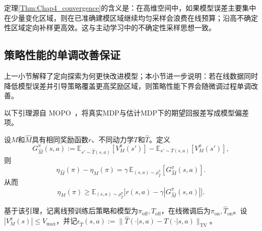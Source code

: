 定理\ref{Thm:Chap4_convergence}的含义是：在高维空间中，如果模型误差主要集中在少量变化区域，则在已准确建模区域继续均匀采样会浪费在线预算；沿高不确定性区域定向补样更高效。这与主动学习中的不确定性采样思想一致\cite{Settles2009Active}。

\subsection{策略性能的单调改善保证}\label{Sec4.3.2}

上一小节解释了定向探索为何更快改进模型；本小节进一步说明：若在线数据同时降低模型误差并引导策略覆盖更高奖励区域，则策略性能下界会随微调过程单调改善。

以下引理源自 MOPO~\cite{Yu2020MOPO}，将真实MDP与估计MDP下的期望回报差写成模型偏差项。

\begin{lem}\label{Lem:Chap4_telescoping}
  设$M$和$\hat{M}$具有相同奖励函数$r$、不同动力学$T$和$\hat{T}$。定义
  \begin{equation}
    G_{\hat{M}}^{\pi}(s,a):=\mathbb{E}_{s'\sim\hat{T}(s,a)}[V_M^{\pi}(s')]-\mathbb{E}_{s'\sim T(s,a)}[V_M^{\pi}(s')],
  \end{equation}
  则
  \begin{equation}\label{Eq:Chap4_telescoping}
    \eta_{\hat{M}}(\pi)-\eta_M(\pi)=\gamma\,\mathbb{E}_{(s,a)\sim\rho^{\pi}_{\hat{T}}}\left[G_{\hat{M}}^{\pi}(s,a)\right].
  \end{equation}
  从而
  \begin{equation}\label{Eq:Chap4_lower_bound}
    \eta_M(\pi)\ge\mathbb{E}_{(s,a)\sim\rho^{\pi}_{\hat{T}}}\big[r(s,a)-\gamma|G_{\hat{M}}^{\pi}(s,a)|\big].
  \end{equation}
\end{lem}

基于该引理，记离线预训练后策略和模型为$\pi_{\mathrm{off}},\hat{T}_{\mathrm{off}}$，在线微调后为$\pi_{\mathrm{on}},\hat{T}_{\mathrm{on}}$。设$|V_M^{\pi}(s)|\le V_{\max}$，并记$\epsilon_{\hat{T}}(s,a):=\|\hat{T}(\cdot|s,a)-T(\cdot|s,a)\|_{\mathrm{TV}}$。

